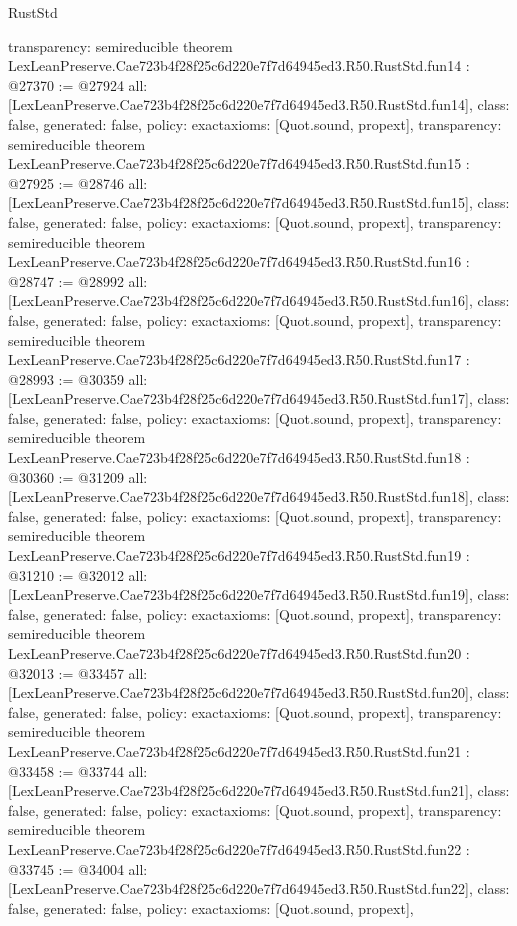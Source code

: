 \begin{lexlean}{RustStd}
\begin{coremodule}
{  transparency: semireducible
}
theorem LexLeanPreserve.Cae723b4f28f25c6d220e7f7d64945ed3.R50.RustStd.fun14 : @27370 := @27924 {
  all: [LexLeanPreserve.Cae723b4f28f25c6d220e7f7d64945ed3.R50.RustStd.fun14],
  class: false,
  generated: false,
  policy: exact{axioms: [Quot.sound, propext]},
  transparency: semireducible
}
theorem LexLeanPreserve.Cae723b4f28f25c6d220e7f7d64945ed3.R50.RustStd.fun15 : @27925 := @28746 {
  all: [LexLeanPreserve.Cae723b4f28f25c6d220e7f7d64945ed3.R50.RustStd.fun15],
  class: false,
  generated: false,
  policy: exact{axioms: [Quot.sound, propext]},
  transparency: semireducible
}
theorem LexLeanPreserve.Cae723b4f28f25c6d220e7f7d64945ed3.R50.RustStd.fun16 : @28747 := @28992 {
  all: [LexLeanPreserve.Cae723b4f28f25c6d220e7f7d64945ed3.R50.RustStd.fun16],
  class: false,
  generated: false,
  policy: exact{axioms: [Quot.sound, propext]},
  transparency: semireducible
}
theorem LexLeanPreserve.Cae723b4f28f25c6d220e7f7d64945ed3.R50.RustStd.fun17 : @28993 := @30359 {
  all: [LexLeanPreserve.Cae723b4f28f25c6d220e7f7d64945ed3.R50.RustStd.fun17],
  class: false,
  generated: false,
  policy: exact{axioms: [Quot.sound, propext]},
  transparency: semireducible
}
theorem LexLeanPreserve.Cae723b4f28f25c6d220e7f7d64945ed3.R50.RustStd.fun18 : @30360 := @31209 {
  all: [LexLeanPreserve.Cae723b4f28f25c6d220e7f7d64945ed3.R50.RustStd.fun18],
  class: false,
  generated: false,
  policy: exact{axioms: [Quot.sound, propext]},
  transparency: semireducible
}
theorem LexLeanPreserve.Cae723b4f28f25c6d220e7f7d64945ed3.R50.RustStd.fun19 : @31210 := @32012 {
  all: [LexLeanPreserve.Cae723b4f28f25c6d220e7f7d64945ed3.R50.RustStd.fun19],
  class: false,
  generated: false,
  policy: exact{axioms: [Quot.sound, propext]},
  transparency: semireducible
}
theorem LexLeanPreserve.Cae723b4f28f25c6d220e7f7d64945ed3.R50.RustStd.fun20 : @32013 := @33457 {
  all: [LexLeanPreserve.Cae723b4f28f25c6d220e7f7d64945ed3.R50.RustStd.fun20],
  class: false,
  generated: false,
  policy: exact{axioms: [Quot.sound, propext]},
  transparency: semireducible
}
theorem LexLeanPreserve.Cae723b4f28f25c6d220e7f7d64945ed3.R50.RustStd.fun21 : @33458 := @33744 {
  all: [LexLeanPreserve.Cae723b4f28f25c6d220e7f7d64945ed3.R50.RustStd.fun21],
  class: false,
  generated: false,
  policy: exact{axioms: [Quot.sound, propext]},
  transparency: semireducible
}
theorem LexLeanPreserve.Cae723b4f28f25c6d220e7f7d64945ed3.R50.RustStd.fun22 : @33745 := @34004 {
  all: [LexLeanPreserve.Cae723b4f28f25c6d220e7f7d64945ed3.R50.RustStd.fun22],
  class: false,
  generated: false,
  policy: exact{axioms: [Quot.sound, propext]},
}
\end{coremodule}
\end{lexlean}
